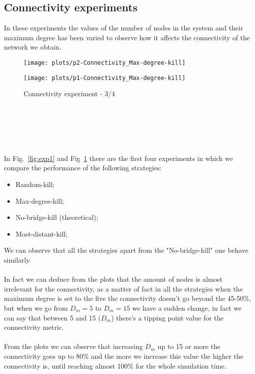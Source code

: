 \documentclass{llncs}
\begin{document}
\subsection{Connectivity experiments}
In these experiments the values of the number of nodes in the system and their maximum degree has been varied to observe how it affects the connectivity of the network we obtain.
\begin{figure}[h!]
	\begin{minipage}{0.5\textwidth}
		\texttt{[image: plots/p2-Connectivity\_Max-degree-kill]}
		\caption{Connectivity experiment - 1/2}
		\label{fig:exp1}
	\end{minipage}\hfill
	\begin{minipage}{0.5\textwidth}
		\centering
		\texttt{[image: plots/p1-Connectivity\_Max-degree-kill]}
		\caption{Connectivity experiment - 3/4}
		\label{fig:exp2}
	\end{minipage}
\end{figure}
\\\\\\\\\\
In Fig.~\ref{fig:exp1} and Fig~\ref{fig:exp2} there are the first four experiments in which we compare the performance of the following strategies:
\begin{itemize}
	\item Random-kill;
	\item Max-degree-kill;
	\item No-bridge-kill (theoretical);
	\item Most-distant-kill;
\end{itemize}
%
We can observe that all the strategies apart from the "No-bridge-kill" one behave similarly.
\\\\
In fact we can deduce from the plots that the amount of nodes is almost irrelevant for the connectivity, as a matter of fact in all the strategies when the maximum degree is set to the five the connectivity doesn't go beyond the 45-50\%, but when we go from $D_{m}=5$ to $D_{m}=15$ we have a sudden change, in fact we can say that between 5 and 15 ($D_{m}$) there's a tipping point value for the connectivity metric.\\\\
%
From the plots we can observe that increasing $D_{m}$ up to 15 or more the connectivity goes up to 80\% and the more we increase this value the higher the connectivity is, until reaching almost 100\% for the whole simulation time.
\end{document}
